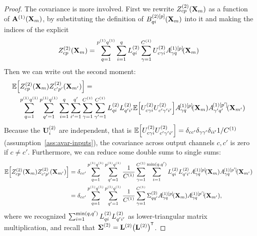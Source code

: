 {{\begin{proof}
  The covariance is more involved. First we rewrite $Z_{cp}^{(2)}(\mathbf{X}_m)$ as a
  function of $\mathbf{A}^{(1)}(\mathbf{X}_m)$, by substituting the definition of
  $B^{(2)[p]}_{q i}(\mathbf{X}_m)$ into it and making the indices of
  the \MatMul explicit
  \begin{equation}
    Z_{cp}^{(2)}(\vX_m) = \sum_{\patchidx=1}^{\patchsize{1}} \sum_{i=1}^{\patchidx}
    \priorLscov{2}_{\patchidx i}  \sum_{\gamma=1}^{\layerC{1}} \layerUs{2}_{c\gamma i}
    \layerNLAsmp{(1)[\patch]}{\gamma\patchidx}{\vX_m}
  \end{equation}
  Then we can write out the second moment:
  \begin{equation}
    \begin{aligned}
    &\ExpSymb\sqb{Z_{cp}^{(2)}(\vX_m) Z_{c'p'}^{(2)}(\vX_{m'})} =  \\
    &\hspace{1em} \sum_{\patchidx=1}^{\patchsize{1}} \sum_{\patchidx'=1}^{\patchsize{1}}
                  \sum_{i=1}^{\patchidx}\sum_{i'=1}^{\patchidx'}
                  \sum_{\gamma=1}^{\layerC{1}} \sum_{\gamma'=1}^{\layerC{1}} 
                  \priorLscov{2}_{\patchidx i} \priorLscov{2}_{\patchidx' i'}
                  \ExpSymb\sqb{\layerUs{2}_{c\gamma i}
                  \layerUs{2}_{c'\gamma' i'}}
                  \layerNLAsmp{(1)[\patch]}{\gamma\patchidx}{\vX_m}
                  \layerNLAsmp{(1)[\patch']}{\gamma'\patchidx'}{\vX_{m'}}
  \end{aligned}
  \end{equation}
  Because the $\mathbf{U}^{(2)}_{i}$ are independent, that is
  $ \ExpSymb\sqb{\layerUs{2}_{c\gamma i}
    \layerUs{2}_{c'\gamma' i'}} = \delta_{cc'} \delta_{\gamma\gamma'}
  \delta_{ii'} 1/\layerC{1}$ (assumption~\ref{ass:avar-inputs}),
  the covariance across output channels $c, c'$ is zero if $c\neq c'$.
  Furthermore, we can reduce some double sums to single sums:
  \begin{align}
    \ExpSymb\sqb{Z_{cp}^{(2)}(\vX_m) Z_{c'p'}^{(2)}(\vX_{m'})} &= \delta_{cc'}
    \sum_{\patchidx=1}^{\patchsize{1}}
    \sum_{\patchidx'=1}^{\patchsize{1}}
    \frac{1}{\layerC{1}}\sum_{\gamma=1}^{\layerC{1}}
    \sum_{i=1}^{\text{min}(\patchidx, \patchidx')}
    \priorLscov{2}_{\patchidx i} \priorLscov{2}_{\patchidx' i'}
    \layerNLAsmp{(1)[\patch]}{\gamma\patchidx}{\vX_m}
    \layerNLAsmp{(1)[\patch']}{\gamma\patchidx}{\vX_{m'}} \\
                                                               &= \delta_{cc'}\sum_{\patchidx=1}^{\patchsize{1}}
    \sum_{\patchidx'=1}^{\patchsize{1}}
    \frac{1}{\layerC{1}}\sum_{\gamma=1}^{\layerC{1}}
    \priorWcovs{2}_{\patchidx \patchidx'}
    \layerNLAsmp{(1)[\patch]}{\gamma\patchidx}{\vX_m}
    \layerNLAsmp{(1)[\patch']}{\gamma\patchidx}{\vX_{m'}},
  \end{align}
  where we recognized $ \sum_{i=1}^{\text{min}(q, q')}
  L^{(2)}_{q i} L^{(2)}_{q' i'}$ as lower-triangular matrix multiplication,
  and recall that $\priorWcov{2} = \priorLcov{2}\bra{\priorLcov{2}}^\tp$.


\end{proof}}}
